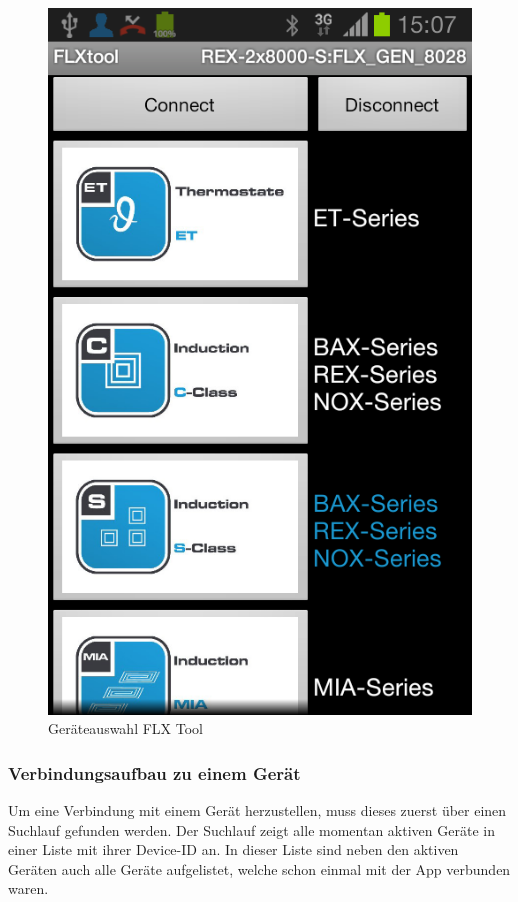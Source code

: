 \begin{figure}
\vspace{-1cm}
	\includegraphics[scale=0.3]{analysis/res/SelectDevice}
	\caption{Geräteauswahl FLX Tool}
\end{figure}

\subsubsection{Verbindungsaufbau zu einem Gerät}
\label{subsubsec:Verbindungsaufbau zu einem Gerät}

Um eine Verbindung mit einem Gerät herzustellen, muss dieses zuerst über einen Suchlauf gefunden werden. Der Suchlauf zeigt alle momentan aktiven Geräte in einer Liste mit ihrer Device-ID an. In dieser Liste sind neben den aktiven Geräten auch alle Geräte aufgelistet, welche schon einmal mit der App verbunden waren.

